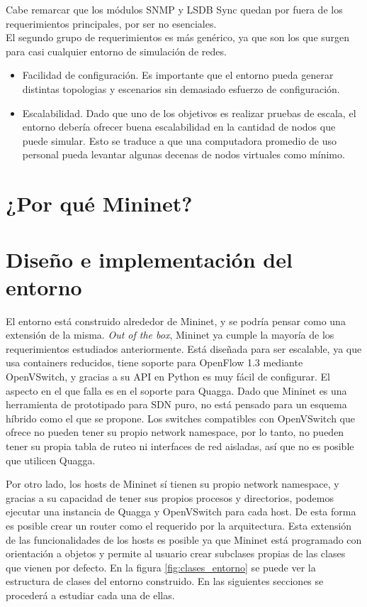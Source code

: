 Cabe remarcar que los módulos SNMP y LSDB Sync quedan por fuera de los requerimientos principales, por ser no esenciales. \\

El segundo grupo de requerimientos es más genérico, ya que son los que surgen para casi cualquier entorno de simulación de redes.

\begin{itemize} 
	\item Facilidad de configuración. Es importante que el entorno pueda generar distintas topologias y escenarios sin demasiado esfuerzo de configuración.
	\item Escalabilidad. Dado que uno de los objetivos es realizar pruebas de escala, el entorno debería ofrecer buena escalabilidad en la cantidad de nodos que puede simular. Esto se traduce a que una computadora promedio de uso personal pueda levantar algunas decenas de nodos virtuales como mínimo.
\end{itemize}

\section{¿Por qué Mininet?}


\section{Diseño e implementación del entorno}
El entorno está construido alrededor de Mininet, y se podría pensar como una extensión de la misma. \textit{Out of the box}, Mininet ya cumple la mayoría de los requerimientos estudiados anteriormente. Está diseñada para ser escalable, ya que usa containers reducidos, tiene soporte para OpenFlow 1.3 mediante OpenVSwitch, y gracias a su API en Python es muy fácil de configurar. El aspecto en el que falla es en el soporte para Quagga. Dado que Mininet es una herramienta de prototipado para SDN puro, no está pensado para un esquema híbrido como el que se propone. Los switches compatibles con OpenVSwitch que ofrece no pueden tener su propio network namespace, por lo tanto, no pueden tener su propia tabla de ruteo ni interfaces de red aisladas, así que no es posible que utilicen Quagga.

Por otro lado, los hosts de Mininet sí tienen su propio network namespace, y gracias a su capacidad de tener sus propios procesos y directorios, podemos ejecutar una instancia de Quagga y OpenVSwitch para cada host. De esta forma es posible crear un router como el requerido por la arquitectura. Esta extensión de las funcionalidades de los hosts es posible ya que Mininet está programado con orientación a objetos y permite al usuario crear subclases propias de las clases que vienen por defecto. En la figura \ref{fig:clases_entorno} se puede ver la estructura de clases del entorno construido. En las siguientes secciones se procederá a estudiar cada una de ellas.

